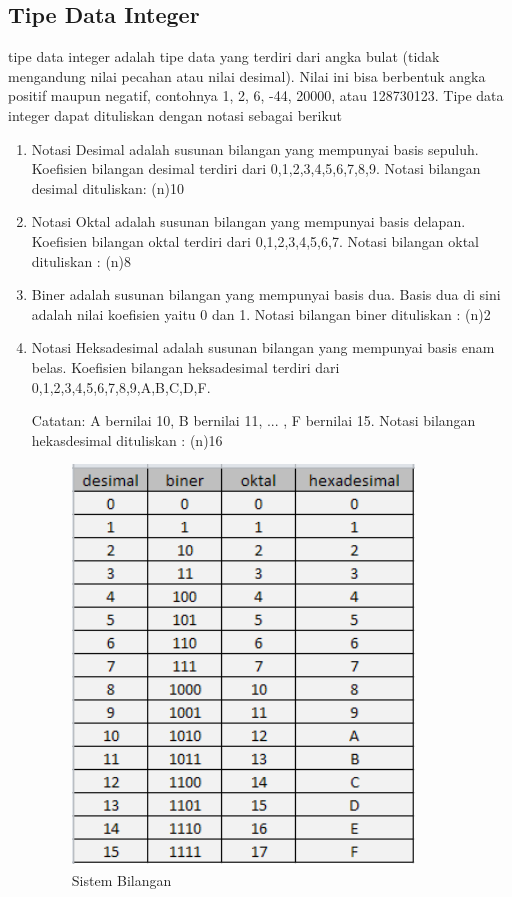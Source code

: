 \subsection{Tipe Data Integer}
 tipe data integer adalah tipe data yang terdiri dari angka bulat (tidak mengandung nilai pecahan atau nilai desimal). Nilai ini bisa berbentuk angka positif maupun negatif, contohnya 1, 2, 6, -44, 20000, atau 128730123. Tipe data integer dapat dituliskan dengan notasi sebagai berikut
\begin{enumerate}
\item Notasi Desimal adalah susunan bilangan yang mempunyai basis sepuluh. 
Koefisien bilangan desimal terdiri dari 0,1,2,3,4,5,6,7,8,9.
Notasi bilangan desimal dituliskan: (n)10
\item Notasi Oktal adalah susunan bilangan yang mempunyai basis delapan. 
Koefisien bilangan oktal terdiri dari 0,1,2,3,4,5,6,7.
Notasi bilangan oktal dituliskan : (n)8
\item Biner adalah susunan bilangan yang mempunyai basis dua. 
Basis dua di sini adalah nilai koefisien yaitu 0 dan 1.
Notasi bilangan biner dituliskan : (n)2
\item Notasi Heksadesimal adalah susunan bilangan yang mempunyai basis enam belas. 
Koefisien bilangan heksadesimal terdiri dari 0,1,2,3,4,5,6,7,8,9,A,B,C,D,F.

Catatan: A bernilai 10, B bernilai 11, ... , F bernilai 15.
Notasi bilangan hekasdesimal dituliskan : (n)16

\begin{figure}[!htbp]
 \centering
 \includegraphics[width=.50\textwidth]{figures/sistem_bilangan.png}
 \caption{Sistem Bilangan}\label{fig:inputchapter}
\end{figure}

\end{enumerate}

